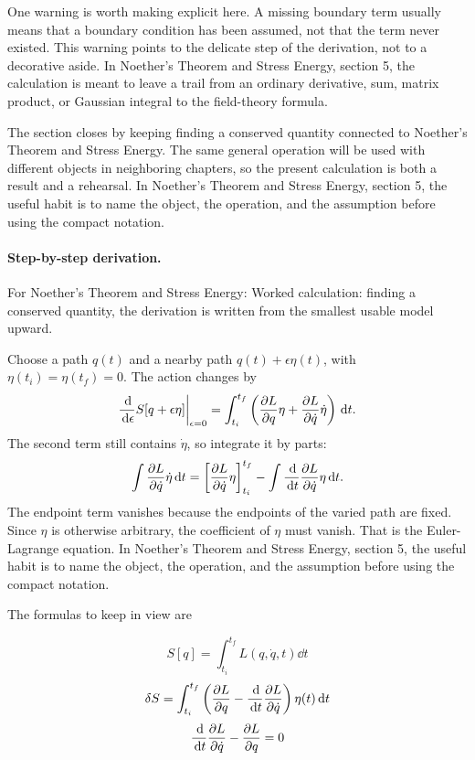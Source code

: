 One warning is worth making explicit here.  A missing boundary term usually means that a boundary condition has been assumed, not that the term never existed.  This warning points to the delicate step of the derivation, not to a decorative aside.  In Noether's Theorem and Stress Energy, section 5, the calculation is meant to leave a trail from an ordinary derivative, sum, matrix product, or Gaussian integral to the field-theory formula.

The section closes by keeping finding a conserved quantity connected to Noether's Theorem and Stress Energy.  The same general operation will be used with different objects in neighboring chapters, so the present calculation is both a result and a rehearsal.  In Noether's Theorem and Stress Energy, section 5, the useful habit is to name the object, the operation, and the assumption before using the compact notation.



\paragraph{Step-by-step derivation.}

For Noether's Theorem and Stress Energy: Worked calculation: finding a conserved quantity, the derivation is written from the smallest usable model upward.

Choose a path \(q(t)\) and a nearby path \(q(t)+\epsilon\eta(t)\), with \(\eta(t_i)=\eta(t_f)=0\).  The action changes by
\[
  \frac{\,\mathrm d}{\,\mathrm d\epsilon}S[q+\epsilon\eta]\bigg|_{\epsilon=0}
  =
  \int_{t_i}^{t_f}
  \left(
  \frac{\partial L}{\partial q}\eta+\frac{\partial L}{\partial\dot q}\dot\eta
  \right)\,\mathrm d t.
\]
The second term still contains \(\dot\eta\), so integrate it by parts:
\[
  \int \frac{\partial L}{\partial\dot q}\dot\eta\,\mathrm d t
  =
  \left[\frac{\partial L}{\partial\dot q}\eta\right]_{t_i}^{t_f}
  -
  \int \frac{\,\mathrm d}{\,\mathrm d t}\frac{\partial L}{\partial\dot q}\eta\,\mathrm d t.
\]
The endpoint term vanishes because the endpoints of the varied path are fixed.  Since \(\eta\) is otherwise arbitrary, the coefficient of \(\eta\) must vanish.  That is the Euler-Lagrange equation.  In Noether's Theorem and Stress Energy, section 5, the useful habit is to name the object, the operation, and the assumption before using the compact notation.

The formulas to keep in view are

\[
  S[q]=\int_{t_i}^{t_f}L(q,\dot q,t)\dd t
\]
\[
  \delta S=\int_{t_i}^{t_f}\left(\frac{\partial L}{\partial q}-\frac{\,\mathrm d}{\,\mathrm d t}\frac{\partial L}{\partial\dot q}\right)\eta(t)\,\mathrm d t
\]
\[
  \frac{\,\mathrm d}{\,\mathrm d t}\frac{\partial L}{\partial\dot q}-\frac{\partial L}{\partial q}=0
\]

